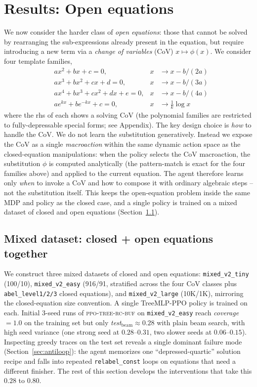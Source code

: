 \documentclass{article}
\theoremstyle{plain}
\theoremstyle{definition}
\theoremstyle{remark}
\begin{document}
\section{Results: Open equations}
\label{sec:open}
We now consider the harder class of \emph{open equations}: those that cannot be solved by rearranging the sub-expressions already present in the equation, but require introducing a new term via a \emph{change of variables} (CoV) $x \mapsto \phi(x)$. We consider four template families,
\begin{align}
    & a x^2 + b x + c = 0, & x &\to x - b/(2a) \\
    & a x^3 + b x^2 + c x + d = 0, & x &\to x - b/(3a) \\
    & a x^4 + b x^3 + c x^2 + d x + e = 0, & x &\to x - b/(4a) \\
    & a e^{k x} + b e^{-k x} + c = 0, & x &\to \tfrac{1}{k}\log x
\end{align}
where the rhs of each shows a solving CoV (the polynomial families are restricted to fully-depressable special forms; see Appendix). The key design choice is \emph{how} to handle the CoV. We do not learn the substitution generatively. Instead we expose the CoV as a single \emph{macroaction} within the same dynamic action space as the closed-equation manipulations: when the policy selects the CoV macroaction, the substitution $\phi$ is computed analytically (the pattern-match is exact for the four families above) and applied to the current equation. The agent therefore learns only \emph{when} to invoke a CoV and how to compose it with ordinary algebraic steps -- not the substitution itself. This keeps the open-equation problem inside the same MDP and policy as the closed case, and a single policy is trained on a mixed dataset of closed and open equations (Section~\ref{sec:mixed}).

\subsection{Mixed dataset: closed + open equations together}
\label{sec:mixed}
We construct three mixed datasets of closed and open equations: \texttt{mixed\_v2\_tiny} (100/10), \texttt{mixed\_v2\_easy} (916/91, stratified across the four CoV classes plus \texttt{abel\_level1/2/3} closed equations), and \texttt{mixed\_v2\_large} (10K/1K), mirroring the closed-equation size convention. A single TreeMLP-PPO policy is trained on each. Initial 3-seed runs of \textsc{ppo-tree-rc-buf} on \texttt{mixed\_v2\_easy} reach \textit{coverage}$=1.0$ on the training set but only \textit{test}$_{\text{beam}}\approx 0.28$ with plain beam search, with high seed variance (one strong seed at $0.28$--$0.31$, two slower seeds at $0.06$--$0.15$). Inspecting greedy traces on the test set reveals a single dominant failure mode (Section~\ref{sec:antiloop}): the agent memorizes one ``depressed-quartic'' solution recipe and falls into repeated \texttt{relabel\_const} loops on equations that need a different finisher. The rest of this section develops the interventions that take this $0.28$ to $0.80$.
\end{document}
